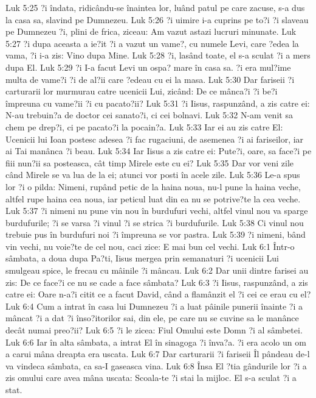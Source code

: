 Luk 5:25  ?i îndata, ridicându-se înaintea lor, luând patul pe care zacuse, s-a dus la casa sa, slavind pe Dumnezeu.
Luk 5:26  ?i uimire i-a cuprins pe to?i ?i slaveau pe Dumnezeu ?i, plini de frica, ziceau: Am vazut astazi lucruri minunate.
Luk 5:27  ?i dupa aceasta a ie?it ?i a vazut un vame?, cu numele Levi, care ?edea la vama, ?i i-a zis: Vino dupa Mine.
Luk 5:28  ?i, lasând toate, el s-a sculat ?i a mers dupa El.
Luk 5:29  ?i I-a facut Levi un ospa? mare în casa sa. ?i era mul?ime multa de vame?i ?i de al?ii care ?edeau cu ei la masa.
Luk 5:30  Dar fariseii ?i carturarii lor murmurau catre ucenicii Lui, zicând: De ce mânca?i ?i be?i împreuna cu vame?ii ?i cu pacato?ii?
Luk 5:31  ?i Iisus, raspunzând, a zis catre ei: N-au trebuin?a de doctor cei sanato?i, ci cei bolnavi.
Luk 5:32  N-am venit sa chem pe drep?i, ci pe pacato?i la pocain?a.
Luk 5:33  Iar ei au zis catre El: Ucenicii lui Ioan postesc adesea ?i fac rugaciuni, de asemenea ?i ai fariseilor, iar ai Tai manânca ?i beau.
Luk 5:34  Iar Iisus a zis catre ei: Pute?i, oare, sa face?i pe fiii nun?ii sa posteasca, cât timp Mirele este cu ei?
Luk 5:35  Dar vor veni zile când Mirele se va lua de la ei; atunci vor posti în acele zile.
Luk 5:36  Le-a spus lor ?i o pilda: Nimeni, rupând petic de la haina noua, nu-l pune la haina veche, altfel rupe haina cea noua, iar peticul luat din ea nu se potrive?te la cea veche.
Luk 5:37  ?i nimeni nu pune vin nou în burdufuri vechi, altfel vinul nou va sparge burdufurile; ?i se varsa ?i vinul ?i se strica ?i burdufurile.
Luk 5:38  Ci vinul nou trebuie pus în burdufuri noi ?i împreuna se vor pastra.
Luk 5:39  ?i nimeni, bând vin vechi, nu voie?te de cel nou, caci zice: E mai bun cel vechi.
Luk 6:1  Într-o sâmbata, a doua dupa Pa?ti, Iisus mergea prin semanaturi ?i ucenicii Lui smulgeau spice, le frecau cu mâinile ?i mâncau.
Luk 6:2  Dar unii dintre farisei au zis: De ce face?i ce nu se cade a face sâmbata?
Luk 6:3  ?i Iisus, raspunzând, a zis catre ei: Oare n-a?i citit ce a facut David, când a flamânzit el ?i cei ce erau cu el?
Luk 6:4  Cum a intrat în casa lui Dumnezeu ?i a luat pâinile punerii înainte ?i a mâncat ?i a dat ?i înso?itorilor sai, din ele, pe care nu se cuvine sa le manânce decât numai preo?ii?
Luk 6:5  ?i le zicea: Fiul Omului este Domn ?i al sâmbetei.
Luk 6:6  Iar în alta sâmbata, a intrat El în sinagoga ?i înva?a. ?i era acolo un om a carui mâna dreapta era uscata.
Luk 6:7  Dar carturarii ?i fariseii Îl pândeau de-l va vindeca sâmbata, ca sa-I gaseasca vina.
Luk 6:8  Însa El ?tia gândurile lor ?i a zis omului care avea mâna uscata: Scoala-te ?i stai la mijloc. El s-a sculat ?i a stat.
